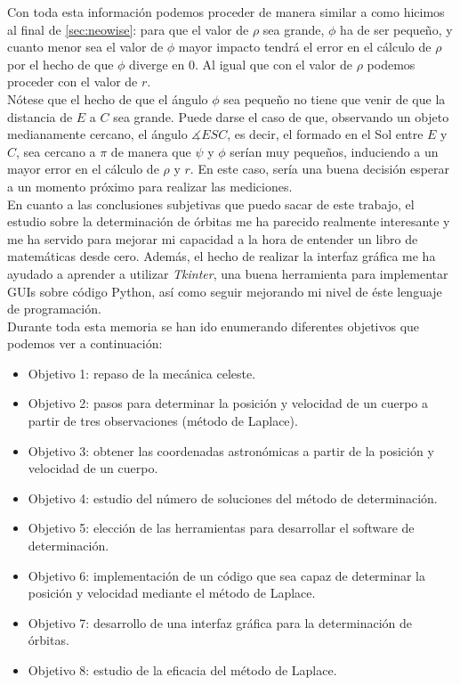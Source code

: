 Con toda esta información podemos proceder de manera similar a como hicimos al final de \ref{sec:neowise}: para que el valor de $\rho$ sea grande, $\phi$ ha de ser pequeño, y cuanto menor sea el valor de $\phi$ mayor impacto tendrá el error en el cálculo de $\rho$ por el hecho de que $\phi$ diverge en 0. Al igual que con el valor de $\rho$ podemos proceder con el valor de $r$.\\

Nótese que el hecho de que el ángulo $\phi$ sea pequeño no tiene que venir de que la distancia de $E$ a $C$ sea grande. Puede darse el caso de que, observando un objeto medianamente cercano, el ángulo $\measuredangle{ESC}$, es decir, el formado en el Sol entre $E$ y $C$, sea cercano a $\pi$ de manera que $\psi$ y $\phi$ serían muy pequeños, induciendo a un mayor error en el cálculo de $\rho$ y $r$. En este caso, sería una buena decisión esperar a un momento próximo para realizar las mediciones.\\

En cuanto a las conclusiones subjetivas que puedo sacar de este trabajo, el estudio sobre la determinación de órbitas me ha parecido realmente interesante y me ha servido para mejorar mi capacidad a la hora de entender un libro de matemáticas desde cero. Además, el hecho de realizar la interfaz gráfica me ha ayudado a aprender a utilizar \textit{Tkinter}, una buena herramienta para implementar GUIs sobre código Python, así como seguir mejorando mi nivel de éste lenguaje de programación.\\

Durante toda esta memoria se han ido enumerando diferentes objetivos que podemos ver a continuación:
\begin{itemize}
\item Objetivo 1: repaso de la mecánica celeste.
\item Objetivo 2: pasos para determinar la posición y velocidad de un cuerpo a partir de tres observaciones (método de Laplace).
\item Objetivo 3: obtener las coordenadas astronómicas a partir de la posición y velocidad de un cuerpo.
\item Objetivo 4: estudio del número de soluciones del método de determinación.
\item Objetivo 5: elección de las herramientas para desarrollar el software de determinación.
\item Objetivo 6: implementación de un código que sea capaz de determinar la posición y velocidad mediante el método de Laplace.
\item Objetivo 7: desarrollo de una interfaz gráfica para la determinación de órbitas.
\item Objetivo 8: estudio de la eficacia del método de Laplace.
\end{itemize}

